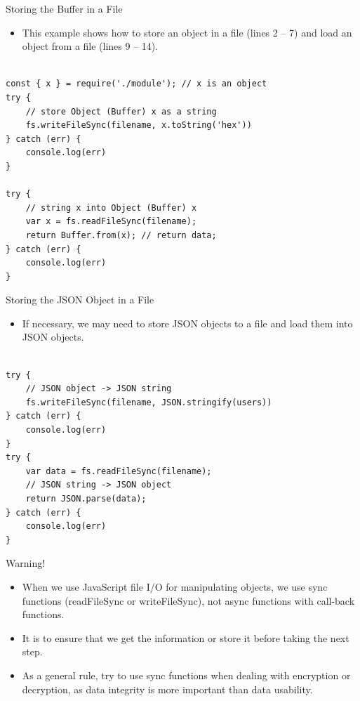 \begin{frame}[fragile]{Storing the Buffer in a File}

\begin{itemize}
	\item This example shows how to store an object in a file (lines 2 -- 7) and load an object from a file (lines 9 -- 14). 
\end{itemize}

\begin{Code}{}%
\begin{lstlisting}[firstnumber=1, label=glabels, xleftmargin=0pt, basicstyle=\scriptsize]% 

const { x } = require('./module'); // x is an object
try {
    // store Object (Buffer) x as a string
    fs.writeFileSync(filename, x.toString('hex'))
} catch (err) {
    console.log(err)
}

try {
    // string x into Object (Buffer) x
    var x = fs.readFileSync(filename);
    return Buffer.from(x); // return data;
} catch (err) {
    console.log(err)
}
\end{lstlisting}%
\end{Code}%
\end{frame}

\begin{frame}[fragile]{Storing the JSON Object in a File}

\begin{itemize}
	\item If necessary, we may need to store JSON objects to a file and load them into JSON objects. 
\end{itemize}

\begin{Code}{}%
\begin{lstlisting}[firstnumber=1, label=glabels, xleftmargin=0pt, basicstyle=\scriptsize]% 

try {
    // JSON object -> JSON string
    fs.writeFileSync(filename, JSON.stringify(users)) 
} catch (err) {
    console.log(err)
}
try {
    var data = fs.readFileSync(filename);
    // JSON string -> JSON object
    return JSON.parse(data); 
} catch (err) {
    console.log(err)
}
\end{lstlisting}%
\end{Code}%

\end{frame}

\begin{frame}[fragile]{Warning!}

\begin{itemize}
	\item When we use JavaScript file I/O for manipulating objects, we use sync functions (readFileSync or writeFileSync), not async functions with call-back functions. 
	\item It is to ensure that we get the information or store it before taking the next step. 
    \item As a general rule, try to use sync functions when dealing with encryption or decryption, as data integrity is more important than data usability. 
\end{itemize}

\end{frame}

